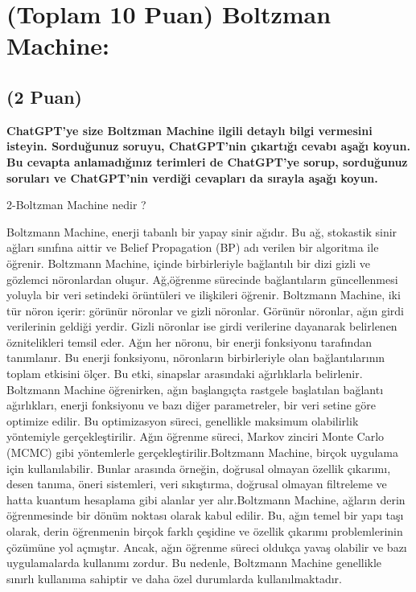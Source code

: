 \documentclass[11pt]{article}
\begin{document}
\section{(Toplam 10 Puan) Boltzman Machine:}

\subsection{(2 Puan)} \textbf{ChatGPT’ye size Boltzman Machine ilgili detaylı bilgi vermesini isteyin. Sorduğunuz soruyu, ChatGPT'nin çıkartığı cevabı aşağı koyun. Bu cevapta anlamadığınız terimleri de ChatGPT’ye sorup, sorduğunuz soruları ve ChatGPT’nin verdiği cevapları da sırayla aşağı koyun.}

2-Boltzman Machine nedir ?

Boltzmann Machine, enerji tabanlı bir yapay sinir ağıdır. Bu ağ, stokastik sinir ağları sınıfına aittir ve Belief Propagation (BP) adı verilen bir algoritma ile öğrenir. Boltzmann Machine, içinde birbirleriyle bağlantılı bir dizi gizli ve gözlemci nöronlardan oluşur. 
Ağ,öğrenme sürecinde bağlantıların güncellenmesi yoluyla bir veri setindeki örüntüleri ve ilişkileri öğrenir.
Boltzmann Machine, iki tür nöron içerir: görünür nöronlar ve gizli nöronlar. Görünür nöronlar, ağın girdi verilerinin geldiği yerdir. Gizli nöronlar ise girdi verilerine dayanarak belirlenen öznitelikleri temsil eder.
Ağın her nöronu, bir enerji fonksiyonu tarafından tanımlanır. Bu enerji fonksiyonu, nöronların birbirleriyle olan bağlantılarının toplam etkisini ölçer. Bu etki, sinapslar arasındaki ağırlıklarla belirlenir.
Boltzmann Machine öğrenirken, ağın başlangıçta rastgele başlatılan bağlantı ağırlıkları, enerji fonksiyonu ve bazı diğer parametreler, bir veri setine göre optimize edilir. Bu optimizasyon süreci, genellikle maksimum 
olabilirlik yöntemiyle gerçekleştirilir. Ağın öğrenme süreci, Markov zinciri Monte Carlo (MCMC) gibi yöntemlerle gerçekleştirilir.Boltzmann Machine, birçok uygulama için kullanılabilir. Bunlar arasında örneğin, doğrusal olmayan özellik çıkarımı, 
desen tanıma, öneri sistemleri, veri sıkıştırma, doğrusal olmayan filtreleme ve hatta kuantum hesaplama gibi alanlar yer alır.Boltzmann Machine, ağların derin öğrenmesinde bir dönüm noktası olarak kabul edilir. Bu, ağın temel bir yapı taşı olarak, 
derin öğrenmenin birçok farklı çeşidine ve özellik çıkarımı problemlerinin çözümüne yol açmıştır. Ancak, ağın öğrenme süreci oldukça yavaş olabilir ve bazı uygulamalarda kullanımı zordur. Bu nedenle, Boltzmann Machine genellikle sınırlı kullanıma sahiptir ve daha özel durumlarda kullanılmaktadır.
\end{document}
